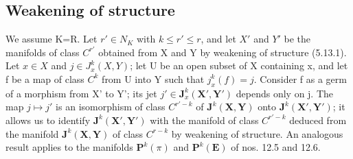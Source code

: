 \subsection{Weakening of structure}

We assume K=R. Let \(r' \in N_{K}\) with \(k \leqslant r' \leqslant r\), and let \(X'\) and \(Y'\) be the manifolds of class \(C^{r'}\) obtained from X and Y by weakening of structure (5.13.1). Let \(x \in X\) and \(j \in J_{x}^{k}(X, Y)\); let U be an open subset of X containing x, and let f be a map of class \(C^{k}\) from U into Y such that \(j_{x}^{k}(f) = j\). Consider f as a germ of a morphism from X' to Y'; its jet \(j' \in \mathbf{J}_{x}^{k}(\mathbf{X}', \mathbf{Y}')\) depends only on j. The map \(j \mapsto j'\) is an isomorphism of class \(C^{r'-k}\) of \(\mathbf{J}^{k}(\mathbf{X}, \mathbf{Y})\) onto \(\mathbf{J}^{k}(\mathbf{X}', \mathbf{Y}')\); it allows us to identify \(\mathbf{J}^{k}(\mathbf{X}', \mathbf{Y}')\) with the manifold of class \(C^{r'-k}\) deduced from the manifold \(\mathbf{J}^{k}(\mathbf{X}, \mathbf{Y})\) of class \(C^{r-k}\) by weakening of structure. An analogous result applies to the manifolds \(\mathbf{P}^{k}(\pi)\) and \(\mathbf{P}^{k}(\mathbf{E})\) of nos. 12.5 and 12.6.

